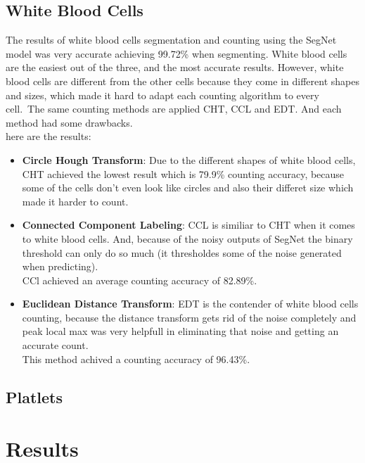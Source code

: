 

\subsection{White Blood Cells}
The results of white blood cells segmentation and counting using the SegNet model was very accurate achieving 99.72\% when segmenting.
White blood cells are the easiest out of the three, and the most accurate results.
However, white blood cells are different from the other cells because they come in different shapes and sizes, which made it hard to adapt each counting algorithm to every cell.\
The same counting methods are applied CHT, CCL and EDT. And each method had some drawbacks.\\
here are the results:

\begin{itemize}
  \item \textbf{Circle Hough Transform}: Due to the different shapes of white blood cells, CHT achieved the lowest result which is 79.9\% counting accuracy, because some of the cells don't even look like circles and also their differet size which made it harder to count.
  \item \textbf{Connected Component Labeling}: CCL is similiar to CHT when it comes to white blood cells. And, because of the noisy outputs of SegNet the binary threshold can only do so much (it thresholdes some of the noise generated when predicting).\\
    CCl achieved an average counting accuracy of 82.89\%.
  \item \textbf{Euclidean Distance Transform}: EDT is the contender of white blood cells counting, because the distance transform gets rid of the noise completely and peak local max was very helpfull in eliminating that noise and getting an accurate count.\\
    This method achived a counting accuracy of 96.43\%.
\end{itemize}



\subsection{Platlets}




\section{Results}
\vspace{0.2in}
\hspace*{0.16in}

